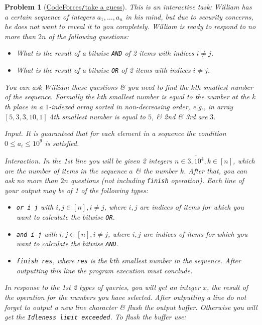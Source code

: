 \documentclass{article}
\newtheorem{problem}{Problem}
\begin{document}
\begin{problem}[\href{https://codeforces.com/contest/1556/problem/D?locale=en}{CodeForces{\tt/}take a guess}]
    This is an interactive task: {\sc William} has a certain sequence of integers $a_1,\ldots,a_n$ in his mind, but due to security concerns, he does not want to reveal it to you completely. {\sc William} is ready to respond to no more than $2n$ of the following questions:
    \begin{itemize}
        \item What is the result of a bitwise {\tt AND} of 2 items with indices $i\ne j$.
        \item What is the result of a bitwise {\tt OR} of 2 items with indices $i\ne j$.
    \end{itemize}
    You can ask {\sc William} these questions \& you need to find the $k$th smallest number of the sequence. Formally the $k$th smallest number is equal to the number at the $k$th place in a $1$-indexed array sorted in non-decreasing order, e.g., in array $[5,3,3,10,1]$ $4$th smallest number is equal to $5$, \& 2nd \& 3rd are $3$.
    \item {\sf Input.} It is guaranteed that for each element in a sequence the condition $0\le a_i\le10^9$ is satisfied.
    \item {\sf Interaction.} In the 1st line you will be given 2 integers $n\in\overline{3,10^4},k\in[n]$, which are the number of items in the sequence $a$ \& the number $k$. After that, you can ask no more than $2n$ questions (not including {\tt finish} operation). Each line of your output may be of 1 of the following types:
    \begin{itemize}
        \item {\tt or i j} with $i,j\in[n],i\ne j$, where $i,j$ are indices of items for which you want to calculate the bitwise {\tt OR}.
        \item {\tt and i j} with $i,j\in[n],i\ne j$, where $i,j$ are indices of items for which you want to calculate the bitwise {\tt AND}.
        \item {\tt finish res}, where {\tt res} is the $k$th smallest number in the sequence. After outputting this line the program execution must conclude.
    \end{itemize}
    In response to the 1st 2 types of queries, you will get an integer $x$, the result of the operation for the numbers you have selected. After outputting a line do not forget to output a new line character \& flush the output buffer. Otherwise you will get the {\tt Idleness limit exceeded}. To flush the buffer use:

\end{problem}
\end{document}
